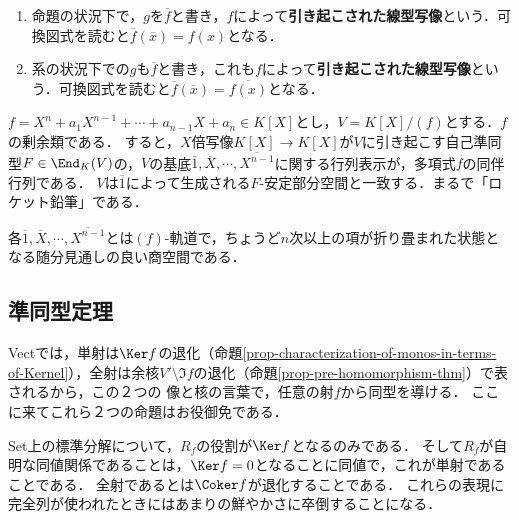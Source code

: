 \documentclass[uplatex, dvipdfmx]{jsreport}
\begin{document}
\begin{definition}\mbox{}
    \begin{enumerate}
        \item 命題の状況下で，$g$を$\overline{f}$と書き，$f$によって\textbf{引き起こされた線型写像}という．可換図式を読むと$\overline{f}(\overline{x})=f(x)$となる．
        \item 系の状況下での$g$も$\overline{f}$と書き，これも$f$によって\textbf{引き起こされた線型写像}という．可換図式を読むと$\overline{f}(\overline{x})=\overline{f(x)}$となる．
    \end{enumerate}
\end{definition}

\begin{example}\label{example-companion-matrix}
    $f=X^n+a_1X^{n-1}+\cdots+a_{n-1}X+a_n\in K[X]$とし，$V=K[X]/(f)$とする．$f$の剰余類である．
    すると，$X$倍写像$K[X]\to K[X]$が$V$に引き起こす自己準同型$F\in\End_K(V)$の，$V$の基底$\overline{1},\overline{X},\cdots,\overline{X^{n-1}}$に関する行列表示が，多項式$f$の同伴行列である．
    $V$は$\overline{1}$によって生成される$F$-安定部分空間と一致する．まるで「ロケット鉛筆」である．

    各$\overline{1},\overline{X},\cdots,\overline{X^{n-1}}$とは$(f)$-軌道で，ちょうど$n$次以上の項が折り畳まれた状態となる随分見通しの良い商空間である．
\end{example}

\subsection{準同型定理}

\begin{tcolorbox}[colframe=ForestGreen, colback=ForestGreen!10!white, breakable,
    title=準同型定理]
    Vectでは，単射は$\Ker f$の退化（命題\ref{prop-characterization-of-monos-in-terms-of-Kernel}），全射は余核$V'\setminus\Im f$の退化（命題\ref{prop-pre-homomorphism-thm}）で表されるから，この２つの
    像と核の言葉で，任意の射$f$から同型を導ける．
    ここに来てこれら２つの命題はお役御免である．

    Set上の標準分解について，$R_f$の役割が$\Ker f$となるのみである．
    そして$R_f$が自明な同値関係であることは，$\Ker f=0$となることに同値で，これが単射であることである．
    全射であるとは$\Coker f$が退化することである．
    これらの表現に完全列が使われたときにはあまりの鮮やかさに卒倒することになる．
\end{tcolorbox}
\end{document}
